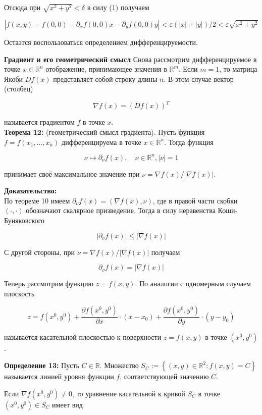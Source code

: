 \documentclass[a4paper,12pt]{article} %
\begin{document}
Отсюда при $\sqrt{x^{2}+y^{2}}<\delta$ в силу (1) получаем

$$
\left|f(x, y)-f(0,0)-\partial_{x} f(0,0) x-\partial_{y} f(0,0) y\right|<\varepsilon(|x|+|y|) / 2<\varepsilon \sqrt{x^{2}+y^{2}}
$$

Остаэтся воспользоваться определением дифференцируемости.

\textbf{Градиент и его геометрический смысл}
Снова рассмотрим дифференцируемое в точке $x \in \mathbb{R}^{n}$ отображение, принимающее значения в $\mathbb{R}^{m}$. Если $m=1$, то матрица Якоби $D f(x)$ представляет собой строку длины $n$. В этом случае вектор (столбец)

$$
\nabla f(x)=(D f(x))^{T}
$$

называется градиентом $f$ в точке $x$.\\
\textbf{Теорема 12:} (геометрический смысл градиента). Пусть функция $f=f\left(x_{1}, \ldots, x_{n}\right)$ дифференцируема в точке $x \in \mathbb{R}^{n}$. Тогда функция

$$
\nu \mapsto \partial_{\nu} f(x), \quad \nu \in \mathbb{R}^{n},|\nu|=1
$$

принимает своё максимальное значение при $\nu=\nabla f(x) /|\nabla f(x)|$.

\textbf{Доказательство:}\\
По теореме 10 имеем $\partial_{\nu} f(x)=(\nabla f(x), \nu)$, где в правой части скобки $(\cdot, \cdot)$ обозначают скалярное призведение. Тогда в силу неравенства Коши-Буняковского

$$
\left|\partial_{\nu} f(x)\right| \leq|\nabla f(x)|
$$

С другой стороны, при $\nu=\nabla f(x) /|\nabla f(x)|$ получаем

$$
\partial_{\nu} f(x)=|\nabla f(x)|
$$

Теперь рассмотрим функцию $z=f(x, y)$. По аналогии с одномерным случаем плоскость

$$
z=f\left(x^{0}, y^{0}\right)+\frac{\partial f\left(x^{0}, y^{0}\right)}{\partial x} \cdot\left(x-x_{0}\right)+\frac{\partial f\left(x^{0}, y^{0}\right)}{\partial y} \cdot\left(y-y_{0}\right)
$$

называется касательной плоскостью к поверхности $z=f(x, y)$ в точке $\left(x^{0}, y^{0}\right)$.

\textbf{Определение 13:} Пусть $C \in \mathbb{R}$. Множество $S_{C}:=\left\{(x, y) \in \mathbb{R}^{2}: f(x, y)=C\right\}$ называется линией уровня функции $f$, соответствующей значению $C$.

Если $\nabla f\left(x^{0}, y^{0}\right) \neq 0$, то уравнение касательной к кривой $S_{C}$ в точке $\left(x^{0}, y^{0}\right) \in S_{C}$ имеет вид
\end{document}

